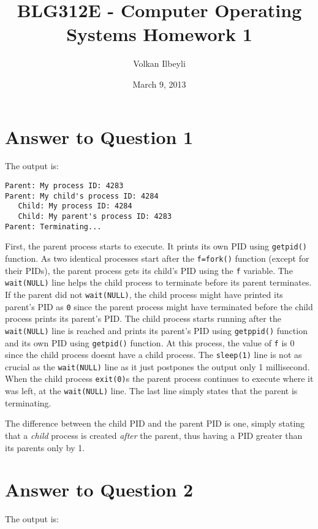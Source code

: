 \documentclass{article}
\begin{document}
\title{BLG312E - Computer Operating Systems Homework 1}
\author{Volkan Ilbeyli}
\date{March 9, 2013}
\maketitle

\section{Answer to Question 1}
The output is:

\begin{lstlisting}
Parent: My process ID: 4283 
Parent: My child's process ID: 4284 
   Child: My process ID: 4284 
   Child: My parent's process ID: 4283 
Parent: Terminating...
\end{lstlisting}

First, the parent process starts to execute. It prints its own PID using \texttt{getpid()} function. As two identical
processes start after the \texttt{f=fork()} function (except for their PIDs), the parent process gets its child's PID
using the \texttt{f} variable. The \texttt{wait(NULL)} line helps the child process to terminate before its parent terminates.
If the parent did not \texttt{wait(NULL)}, the child process might have printed its parent's PID as \texttt{0} since the parent
process might have terminated before the child process prints its parent's PID. The child 
process starts running after the \texttt{wait(NULL)} line is reached and prints its parent's PID using \texttt{getppid()}
function and its own PID using \texttt{getpid()} function. At this process, the value of \texttt{f} is 0 since the child process
doesnt have a child process. The \texttt{sleep(1)} line is not as crucial as the \texttt{wait(NULL)} line as it just postpones the output only
1 millisecond. When the child process \texttt{exit(0)}s the parent process continues to execute where it was left, at the 
\texttt{wait(NULL)} line. The last line simply states that the parent is terminating.

The difference between the child PID and the parent PID is one, simply stating that a \emph{child} process is created \emph{after} 
the parent, thus having a PID greater than its parents only by 1.

\newpage
\section{Answer to Question 2}

The output is:
\end{document}
